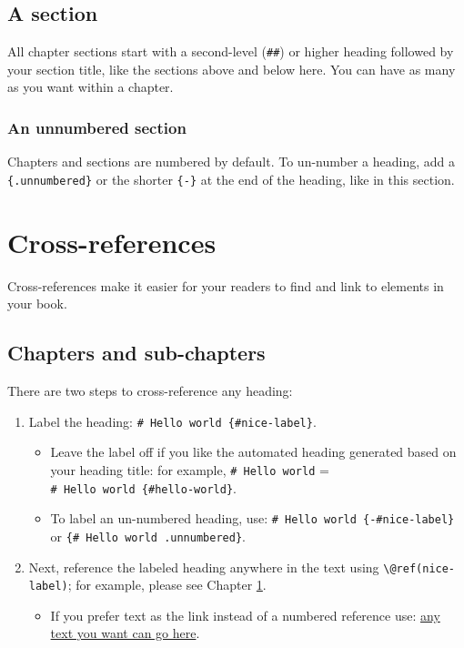 \documentclass[
]{article}
\providecommand{\tightlist}{%
  \setlength{\itemsep}{0pt}\setlength{\parskip}{0pt}}
\theoremstyle{definition}
\theoremstyle{definition}
\theoremstyle{definition}
\theoremstyle{definition}
\theoremstyle{remark}
\begin{document}
\hypertarget{a-section-1}{%
\subsection{A section}\label{a-section-1}}

All chapter sections start with a second-level (\texttt{\#\#}) or higher heading followed by your section title, like the sections above and below here. You can have as many as you want within a chapter.

\hypertarget{an-unnumbered-section-1}{%
\subsubsection*{An unnumbered section}\label{an-unnumbered-section-1}}

Chapters and sections are numbered by default. To un-number a heading, add a \texttt{\{.unnumbered\}} or the shorter \texttt{\{-\}} at the end of the heading, like in this section.

\hypertarget{cross}{%
\section{Cross-references}\label{cross}}

Cross-references make it easier for your readers to find and link to elements in your book.

\hypertarget{chapters-and-sub-chapters}{%
\subsection{Chapters and sub-chapters}\label{chapters-and-sub-chapters}}

There are two steps to cross-reference any heading:

\begin{enumerate}
\def\labelenumi{\arabic{enumi}.}
\tightlist
\item
  Label the heading: \texttt{\#\ Hello\ world\ \{\#nice-label\}}.

  \begin{itemize}
  \tightlist
  \item
    Leave the label off if you like the automated heading generated based on your heading title: for example, \texttt{\#\ Hello\ world} = \texttt{\#\ Hello\ world\ \{\#hello-world\}}.
  \item
    To label an un-numbered heading, use: \texttt{\#\ Hello\ world\ \{-\#nice-label\}} or \texttt{\{\#\ Hello\ world\ .unnumbered\}}.
  \end{itemize}
\item
  Next, reference the labeled heading anywhere in the text using \texttt{\textbackslash{}@ref(nice-label)}; for example, please see Chapter \ref{cross}.

  \begin{itemize}
  \tightlist
  \item
    If you prefer text as the link instead of a numbered reference use: \protect\hyperlink{cross}{any text you want can go here}.
  \end{itemize}
\end{enumerate}
\end{document}
